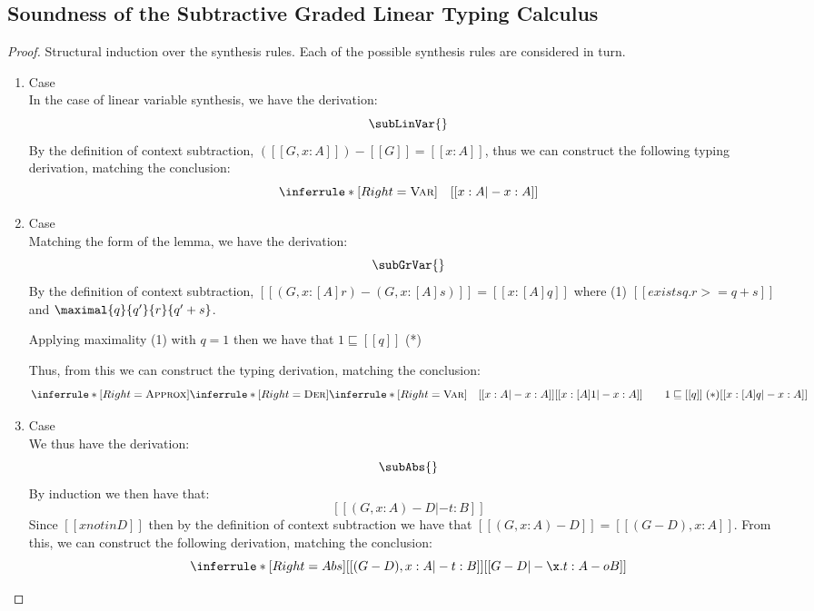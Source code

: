 \subsection{Soundness of the Subtractive Graded Linear Typing Calculus}
\label{proof:linear-sub-sound}
\subSynthSound*

\begin{proof}
Structural induction over the synthesis rules. Each of the possible synthesis
rules are considered in turn.

\begin{enumerate}[itemsep=1em]
  \item Case \subLinVarName \\
  In the case of linear variable synthesis, we have the derivation:
  \[
    \subLinVar{}
  \]
  By the definition of context subtraction,
  $([[G, x : A]]) - [[ G ]] = [[ x : A]]$, thus we
  can construct the following typing derivation, matching the
  conclusion:
  \[
    \inferrule*[Right=\textsc{Var}]
    {\quad}
    {[[ x : A |- x : A ]]}
  \]

\item Case \subGrVarName{} \\
    Matching the form of the lemma, we have the derivation:
    \[
    \subGrVar{}
    \]
    By the definition of context subtraction,
    $ [[ (G, x : [A]r) - (G, x : [A]s) ]] = [[ x : [A] q ]]$
    where (1) $[[ exists q . r >= q + s ]]$ and $\maximal{q}{q'}{r}{q' + s}$.

    Applying maximality (1) with $q = 1$ then we have that $1 \sqsubseteq [[ q ]]$ (*)

    Thus, from this we can construct the typing derivation, matching the conclusion:
    \[
    \inferrule*[Right=\textsc{Approx}]
    {
      \inferrule*[Right=\textsc{Der}]
        {\inferrule*[Right=\textsc{Var}]
          {\quad}
          {[[ x : A |- x : A ]]}
        }
        {[[ x : [A] 1 |- x : A ]] \qquad 1 \sqsubseteq [[ q ]] \; (*)}
    }{
      [[ x : [A] q |- x : A ]]
    }
    \]

  \item Case \subAbsName \\
    We thus have the derivation:
    \[
    \subAbs{}
    \]
    By induction we then have that:
    \[
      [[ (G, x : A) - D |- t : B ]]
    \]
    Since $[[x notin D]]$ then by the definition of context
    subtraction we have that $[[ (G, x : A) - D ]] = [[ (G - D), x : A ]]$.
    From this, we can construct the following derivation, matching the
    conclusion:
    \[
    \inferrule*[Right=Abs]
    {[[ (G - D) , x : A |- t : B]]}{[[ G - D |- \x. t : A -o B ]]}
    \]



\end{enumerate}
\end{proof}

